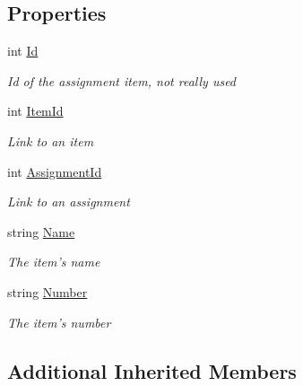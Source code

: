 \subsection*{Properties}
\begin{DoxyCompactItemize}
\item 
int \hyperlink{class_field_service_1_1_data_1_1_assignment_item_ac531826ff2b7d9c84ee5743de5554c25}{Id}
\begin{DoxyCompactList}\small\item\em Id of the assignment item, not really used \end{DoxyCompactList}\item 
int \hyperlink{class_field_service_1_1_data_1_1_assignment_item_ac3061bd4a39adb4e7cc9a42b896cf4f6}{Item\+Id}
\begin{DoxyCompactList}\small\item\em Link to an item \end{DoxyCompactList}\item 
int \hyperlink{class_field_service_1_1_data_1_1_assignment_item_a6d2af96695502f19da2fa12058c4b66d}{Assignment\+Id}
\begin{DoxyCompactList}\small\item\em Link to an assignment \end{DoxyCompactList}\item 
string \hyperlink{class_field_service_1_1_data_1_1_assignment_item_a50377e616fb77004a27069c92d3bc386}{Name}
\begin{DoxyCompactList}\small\item\em The item's name \end{DoxyCompactList}\item 
string \hyperlink{class_field_service_1_1_data_1_1_assignment_item_a4b502f76ea42517efb1fe440d7aee9e1}{Number}
\begin{DoxyCompactList}\small\item\em The item's number \end{DoxyCompactList}\end{DoxyCompactItemize}
\subsection*{Additional Inherited Members}


